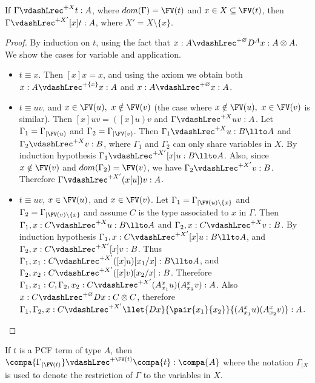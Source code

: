 \documentclass{article}
\begin{document}
\begin{lemma}\label{lem:samevarstype}
If $\Gamma \vdashLrec^{+X} t : A$, where $dom(\Gamma) = \FV(t)$ and
$x \in X \subseteq \FV(t)$, then $\Gamma \vdashLrec^{+X'} [x]t : A$,
where $X' = X \setminus \{x\}$.
\end{lemma}
\begin{proof}
By induction on $t$, using the fact that $x:A
\vdashLrec^{+\varnothing} D^Ax: A \otimes A$.
We show the cases for variable and application.
\begin{itemize}
\item $t \equiv x$. Then $[x]x = x$, and using the axiom we obtain both
   $x:A \vdashLrec^{+\{x\}} x : A$ and $x:A
  \vdashLrec^{+\varnothing} x : A$.
\item $t \equiv uv$, and $x \in \FV(u),\ x\notin\FV(v)$ (the case where
 $x \notin \FV(u),\ x\in\FV(v)$ is similar).
Then $[x]uv =  ([x]u)v$ and $\Gamma \vdashLrec^{+X} uv : A$.
Let $\Gamma_1= \Gamma_{|\FV(u)}$ and $\Gamma_2= \Gamma_{|\FV(v)}$. Then
$\Gamma_1
  \vdashLrec^{+X} u : B \llto A$ and  $\Gamma_2
  \vdashLrec^{+X} v : B$, where $\Gamma_1$ and $\Gamma_2$ can only
share variables in $X$.
By induction hypothesis $\Gamma_1  \vdashLrec^{+X'} [x]u : B \llto A$.
Also, since $x\notin\FV(v)$ and $dom(\Gamma_2) = \FV(v)$, we have
$\Gamma_2  \vdashLrec^{+X'} v : B$.
Therefore   $\Gamma \vdashLrec^{+X'} (x[u])v : A$.
\item $t \equiv uv$, $x \in \FV(u)$, and $x\in\FV(v)$.
Let $\Gamma_1= \Gamma_{|\FV(u)\setminus \{x\}}$ and
$\Gamma_2= \Gamma_{|\FV(v)\setminus \{x\}}$ and
assume $C$ is the type associated to $x$ in $\Gamma$. Then
$\Gamma_1, x: C \vdashLrec^{+X} u : B \llto A$ and
  $\Gamma_2, x: C \vdashLrec^{+X} v : B$.
By induction  hypothesis $\Gamma_1, x: C
  \vdashLrec^{+X'} [x]u : B \llto A$, and $\Gamma_2, x: C
  \vdashLrec^{+X'} [x]v : B$.
Thus $\Gamma_1, x_1: C
  \vdashLrec^{+X'} ([x]u)[x_1/x] : B \llto A$, and
  $\Gamma_2, x_2: C
  \vdashLrec^{+X'} ([x]v)[x_2/x] : B$.
Therefore   $\Gamma_1,  x_1: C, \Gamma_2, x_2: C  \vdashLrec^{+X'}
  (A^x_{x_1}u)(A^x_{x_2}v) : A$.
Also $x : C \vdashLrec^{+\varnothing} D x : C \otimes C$,
therefore $\Gamma_1, \Gamma_2, x : C \vdashLrec^{+X'}
  \llet{Dx}{\pair{x_1}{x_2}}{(A^x_{x_1}u)(A^x_{x_2}v)} : A$.
\end{itemize}
\end{proof}
\begin{lemma}\label{lem:typesystemLX}
If $t$ is a PCF term of type $A$, then $\compa{\Gamma_{|\FV(t)}}
\vdashLrec^{+\FV(t)}\compa{t}:\compa{A}$ where the notation
$\Gamma_{|X}$ is used to denote the restriction of 
$\Gamma$ to the variables in $X$.
 \end{lemma}
\end{document}
